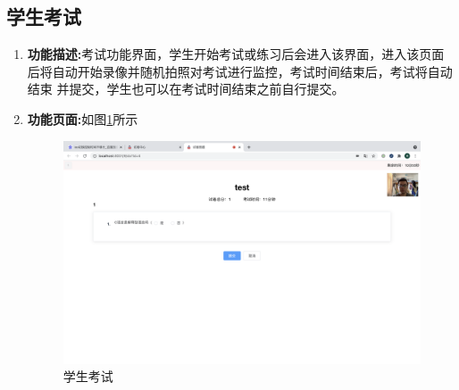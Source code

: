 \subsection{学生考试}
\begin{enumerate}
	\item[] \textbf{功能描述:}考试功能界面，学生开始考试或练习后会进入该界面，进入该页面后将自动开始录像并随机拍照对考试进行监控，考试时间结束后，考试将自动结束
	并提交，学生也可以在考试时间结束之前自行提交。
	\item[] \textbf{功能页面:}如图\ref{figure:skaoshi}所示 \\
		\begin{figure}[H]
			\centering
			\includegraphics[width=1.0\textwidth,keepaspectratio]{data/chapter-5/student/kaoshi.png}
			\caption{学生考试}
			\label{figure:skaoshi}
		\end{figure}
\end{enumerate}